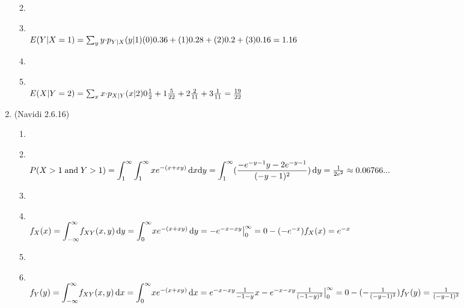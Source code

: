 \documentclass[11pt]{article}
\newcommand\Item[1][]{%
  \ifx\relax#1\relax  \item \else \item[#1] \fi
  \abovedisplayskip=0pt\abovedisplayshortskip=0pt~\vspace*{-\baselineskip}}
\begin{document}
\begin{enumerate}
\begin{enumerate}
                \Item \\
                $E(Y|X=1)=\sum_{y}y{\cdot}p_{Y|X}(y|1)\\
                (0)0.36+(1)0.28+(2)0.2+(3)0.16=1.16$ \\
                
                \Item \\
                $E(X|Y=2)=\sum_{x}x{\cdot}p_{X|Y}(x|2)\\
                0\frac{1}{2}+1\frac{5}{22}+2\frac{2}{11}+3\frac{1}{11} =\frac{19}{22}  
                $

        \end{enumerate}

        \item (Navidi 2.6.16) %
        \begin{enumerate}
                \Item \\
                $P(X>1\mathrm{\;and\;}Y>1) = {\displaystyle \int_{1}^{\infty}\int_{1}^{\infty}xe^{-(x+xy)} \,\mathrm{d}x\mathrm{d}y }\\ \\
                ={\displaystyle \int_{1}^{\infty}(\frac{-e^{-y-1}y-2e^{-y-1}}{(-y-1)^{2}}) \,\mathrm{d}y} \\ \\
                =\frac{1}{2e^{2}} \approx 0.06766...$ \\

                \Item \\
                $f_{X}(x)={\displaystyle \int_{-\infty}^{\infty}}f_{XY}(x,y)  \,\mathrm{d}y \\\\
                ={\displaystyle \int_{0}^{\infty}}xe^{-(x+xy)}  \,\mathrm{d}y \\\\
                =-e^{-x-xy}\big|^{\infty}_{0} = 0-(-e^{-x}) \\\\
                f_{X}(x) = e^{-x}$\\

                \Item \\
                $f_{Y}(y)={\displaystyle \int_{-\infty}^{\infty}}f_{XY}(x,y)  \,\mathrm{d}x \\\\
                ={\displaystyle \int_{0}^{\infty}}xe^{-(x+xy)}  \,\mathrm{d}x\\\\
                =e^{-x-xy}\frac{1}{-1-y}x-e^{-x-xy}\frac{1}{(-1-y)^{2}}\big|^{\infty}_{0} =0-(-\frac{1}{(-y-1)^{2}})\\\\
                f_{Y}(y)=\frac{1}{(-y-1)^{2}}$\\



\end{enumerate}
\end{enumerate}
\end{document}
